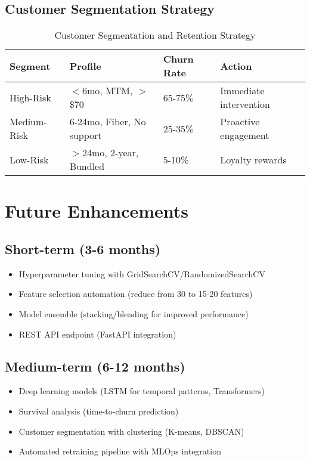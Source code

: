 \documentclass[11pt,a4paper]{article}
\begin{document}
\subsection{Customer Segmentation Strategy}

\begin{table}[h]
\centering
\begin{tabular}{@{}llll@{}}
\toprule
\textbf{Segment} & \textbf{Profile} & \textbf{Churn Rate} & \textbf{Action} \\ \midrule
High-Risk & $<$6mo, MTM, $>$\$70 & 65-75\% & Immediate intervention \\
Medium-Risk & 6-24mo, Fiber, No support & 25-35\% & Proactive engagement \\
Low-Risk & $>$24mo, 2-year, Bundled & 5-10\% & Loyalty rewards \\ \bottomrule
\end{tabular}
\caption{Customer Segmentation and Retention Strategy}
\end{table}

\section{Future Enhancements}

\subsection{Short-term (3-6 months)}
\begin{itemize}
    \item Hyperparameter tuning with GridSearchCV/RandomizedSearchCV
    \item Feature selection automation (reduce from 30 to 15-20 features)
    \item Model ensemble (stacking/blending for improved performance)
    \item REST API endpoint (FastAPI integration)
\end{itemize}

\subsection{Medium-term (6-12 months)}
\begin{itemize}
    \item Deep learning models (LSTM for temporal patterns, Transformers)
    \item Survival analysis (time-to-churn prediction)
    \item Customer segmentation with clustering (K-means, DBSCAN)
    \item Automated retraining pipeline with MLOps integration
\end{itemize}
\end{document}
